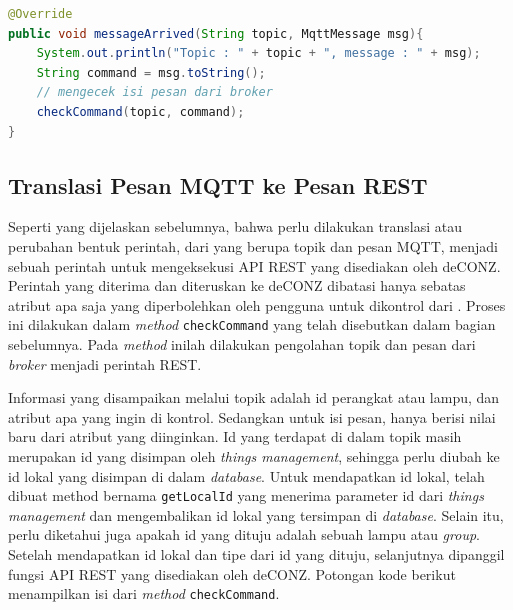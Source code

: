 \begin{lstlisting}[language=Java,label=code:timer,caption=\textit{Method} messageArrived]
@Override
public void messageArrived(String topic, MqttMessage msg){
	System.out.println("Topic : " + topic + ", message : " + msg);
	String command = msg.toString();
	// mengecek isi pesan dari broker
	checkCommand(topic, command);
}
\end{lstlisting}

\subsection{Translasi Pesan MQTT ke Pesan REST}
Seperti yang dijelaskan sebelumnya, bahwa perlu dilakukan translasi atau perubahan bentuk perintah, dari yang berupa topik dan pesan MQTT, menjadi sebuah perintah untuk mengeksekusi API REST yang disediakan oleh deCONZ. Perintah yang diterima dan diteruskan ke deCONZ dibatasi hanya sebatas atribut apa saja yang diperbolehkan oleh pengguna untuk dikontrol dari \plat. Proses ini dilakukan dalam \textit{method} \texttt{checkCommand} yang telah disebutkan dalam bagian sebelumnya. Pada \textit{method} inilah dilakukan pengolahan topik dan pesan dari \textit{broker} menjadi perintah REST.

Informasi yang disampaikan melalui topik adalah id perangkat atau lampu, dan atribut apa yang ingin di kontrol. Sedangkan untuk isi pesan, hanya berisi nilai baru dari atribut yang diinginkan. Id yang terdapat di dalam topik masih merupakan id yang disimpan oleh \textit{things management}, sehingga perlu diubah ke id lokal yang disimpan di dalam \textit{database}. Untuk mendapatkan id lokal, telah dibuat method bernama \texttt{getLocalId} yang menerima parameter id dari \textit{things management} dan mengembalikan id lokal yang tersimpan di \textit{database}. Selain itu, perlu diketahui juga apakah id yang dituju adalah sebuah lampu atau \textit{group}. Setelah mendapatkan id lokal dan tipe dari id yang dituju, selanjutnya dipanggil fungsi API REST yang disediakan oleh deCONZ. Potongan kode berikut menampilkan isi dari \textit{method} \texttt{checkCommand}.



